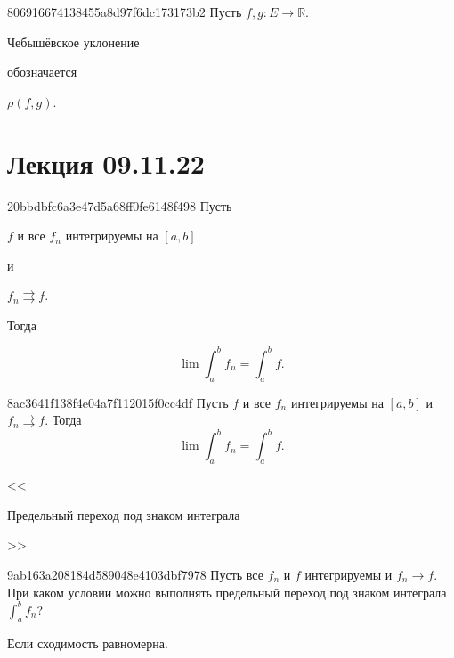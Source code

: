 \begin{note}{806916674138455a8d97f6dc173173b2}
    Пусть \({ f, g : E \to \mathbb R }\).
    \begin{icloze}{2}Чебышёвское уклонение\end{icloze} обозначается \begin{icloze}{1}\({ \rho(f, g) }\).\end{icloze}
\end{note}

\section{Лекция 09.11.22}
\begin{note}{20bbdbfc6a3e47d5a68ff0fe6148f498}
    Пусть \begin{icloze}{3}\({ f }\) и все \({ f_n }\) интегрируемы на \({ [a, b] }\)\end{icloze} и \begin{icloze}{2}\({ f_n \rightrightarrows f }\).\end{icloze}
    Тогда
    \begin{icloze}{1}
        \[
            \lim \int_{a}^{b} f_n = \int_{a}^{b} f.
        \]
    \end{icloze}
\end{note}

\begin{note}{8ac3641f138f4e04a7f112015f0cc4df}
    Пусть \({ f }\) и все \({ f_n }\) интегрируемы на \({ [a, b] }\) и \({ f_n \rightrightarrows f }\).
    Тогда
    \[
        \lim \int_{a}^{b} f_n = \int_{a}^{b} f.
    \]

    \begin{center}
        \tiny
        <<\begin{icloze}{1}Предельный переход под знаком интеграла\end{icloze}>>
    \end{center}
\end{note}

\begin{note}{9ab163a208184d589048e4103dbf7978}
    Пусть все \({ f_n }\) и \({ f }\) интегрируемы и \({ f_n \to f }\).
    При каком условии можно выполнять предельный переход под знаком интеграла \({ \int_{a}^{b} f_n }\)?

    \begin{cloze}{1}
        Если сходимость равномерна.
    \end{cloze}
\end{note}


